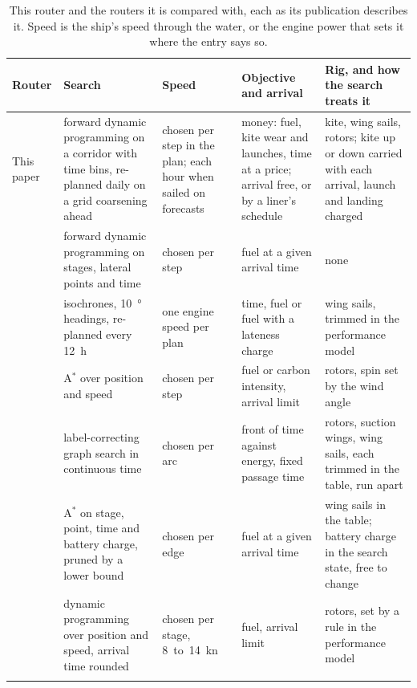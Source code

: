 \begin{table}[tbp]
\centering
\footnotesize
\caption{This router and the routers it is compared with, each as its publication describes it. Speed is the ship's speed through the water, or the engine power that sets it where the entry says so.}
\label{tab:routers}
\begin{tabular}{@{}>{\raggedright\arraybackslash}p{2.4cm}>{\raggedright\arraybackslash}p{3.1cm}>{\raggedright\arraybackslash}p{2.2cm}>{\raggedright\arraybackslash}p{2.7cm}>{\raggedright\arraybackslash}p{3.8cm}@{}}
\toprule
Router & Search & Speed & Objective and arrival & Rig, and how the search treats it \\
\midrule
This paper & forward dynamic programming on a corridor with time bins, re-planned daily on a grid coarsening ahead & chosen per step in the plan; each hour when sailed on forecasts & money: fuel, kite wear and launches, time at a price; arrival free, or by a liner's schedule & kite, wing sails, rotors; kite up or down carried with each arrival, launch and landing charged \\ \addlinespace
\citet{wei2012} & forward dynamic programming on stages, lateral points and time & chosen per step & fuel at a given arrival time & none \\ \addlinespace
\citet{hagiwara1989} & isochrones, \SI{10}{\degree} headings, re-planned every \SI{12}{h} & one engine speed per plan & time, fuel or fuel with a lateness charge & wing sails, trimmed in the performance model \\ \addlinespace
\citet{sun2022} & A$^*$ over position and speed & chosen per step & fuel or carbon intensity, arrival limit & rotors, spin set by the wind angle \\ \addlinespace
\citet{dupuy2025thesis} & label-correcting graph search in continuous time & chosen per arc & front of time against energy, fixed passage time & rotors, suction wings, wing sails, each trimmed in the table, run apart \\ \addlinespace
\citet{gangnant2026} & A$^*$ on stage, point, time and battery charge, pruned by a lower bound & chosen per edge & fuel at a given arrival time & wing sails in the table; battery charge in the search state, free to change \\ \addlinespace
\citet{mason2023} & dynamic programming over position and speed, arrival time rounded & chosen per stage, 8~to~\SI{14}{kn} & fuel, arrival limit & rotors, set by a rule in the performance model \\ \addlinespace

\end{tabular}
\end{table}
